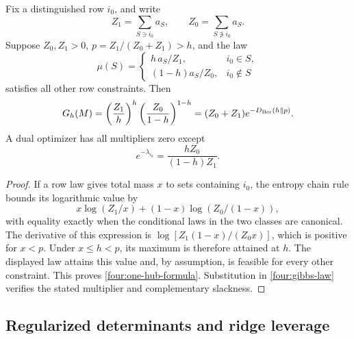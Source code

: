 \begin{proposition}
\label{four:one-hub-entropy}
Fix a distinguished row \(i_0\), and write
\[
 Z_1=\sum_{S\ni i_0}a_S,\qquad
 Z_0=\sum_{S\not\ni i_0}a_S.
\]
Suppose \(Z_0,Z_1>0\), \(p=Z_1/(Z_0+Z_1)>h\), and the law
\[
 \mu(S)=
 \begin{cases}
  h\,a_S/Z_1,&i_0\in S,\\
  (1-h)a_S/Z_0,&i_0\notin S
 \end{cases}
\]
satisfies all other row constraints.  Then
\begin{equation}\label{four:one-hub-formula}
 G_h(M)=\left(\frac{Z_1}{h}\right)^h
         \left(\frac{Z_0}{1-h}\right)^{1-h}
       =(Z_0+Z_1)e^{-D_{\rm Ber}(h\Vert p)}.
\end{equation}
A dual optimizer has all multipliers zero except
\[
 e^{-\lambda_{i_0}}=\frac{hZ_0}{(1-h)Z_1}.
\]
\end{proposition}
\begin{proof}
If a row law gives total mass \(x\) to sets containing \(i_0\),
the entropy chain rule bounds its logarithmic value by
\[
 x\log(Z_1/x)+(1-x)\log(Z_0/(1-x)),
\]
with equality exactly when the conditional laws in the two
classes are canonical.  The derivative of this expression is
\(\log[Z_1(1-x)/(Z_0x)]\), which is positive for \(x<p\).
Under \(x\leq h<p\), its maximum is therefore attained at \(h\).
The displayed law attains this value and, by assumption, is
feasible for every other constraint.  This proves
\eqref{four:one-hub-formula}.  Substitution in
\eqref{four:gibbs-law} verifies the stated multiplier and
complementary slackness.
\end{proof}

\subsection{Regularized determinants and ridge leverage}

